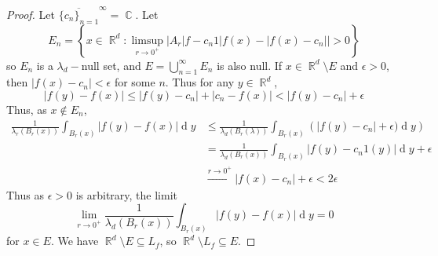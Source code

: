 \documentclass[12pt, a4paper]{memoir}
\DeclareMathOperator{\R}{{\mathbb{R}}}
\DeclareMathOperator{\C}{{\mathbb{C}}}
\newcommand{\fto}[1]{\ensuremath{\xrightarrow{\scriptscriptstyle{#1}}}}
\theoremstyle{nonumberplain}
\newtheorem{proof}{Proof}
\renewcommand{\d}[1]{\ensuremath{\operatorname{d}\!{#1}}} %
\begin{document}
\begin{proof}
    Let $\overline{\{c_n\}_{n=1}}^\infty=\C$.
    Let
    \begin{equation*}
        E_n=\left\{x\in\R^d:\limsup_{r\to 0^+}\left\lvert A_r|f-c_n1|f(x)-|f(x)-c_n|\right\rvert>0\right\}
    \end{equation*}
    so $E_n$ is a $\lambda_d-$null set, and $E=\bigcup_{n=1}^\infty E_n$ is also null.
    If $x\in\R^d\setminus E$ and $\epsilon>0$, then $|f(x)-c_n|<\epsilon$ for some $n$.
    Thus for any $y\in\R^d$,
    \begin{equation*}
        |f(y)-f(x)|\leq|f(y)-c_n|+|c_n-f(x)|<|f(y)-c_n|+\epsilon
    \end{equation*}
    Thus, as $x\notin E_n$,
    \begin{align*}
        \frac{1}{\lambda_r(B_r(x))}\int_{B_r(x)}|f(y)-f(x)|\d{y}&\leq\frac{1}{\lambda_d(B_r(\lambda))}\int_{B_r(x)}\left(|f(y)-c_n|+\epsilon)\d{y}\right)\\
                                                                &=\frac{1}{\lambda_d(B_r(x))}\int_{B_r(x)}|f(y)-c_n1(y)|\d{y}+\epsilon\\
                                                                &\fto{r\to 0^+}|f(x)-c_n|+\epsilon<2\epsilon
    \end{align*}
    Thus as $\epsilon>0$ is arbitrary, the limit
    \begin{equation*}
        \lim_{r\to 0^+}\frac{1}{\lambda_d(B_r(x))}\int_{B_r(x)}|f(y)-f(x)|\d{y}=0
    \end{equation*}
    for $x\in E$.
    We have $\R^d\setminus E\subseteq L_f$, so $\R^d\setminus L_f\subseteq E$.
\end{proof}
\end{document}
